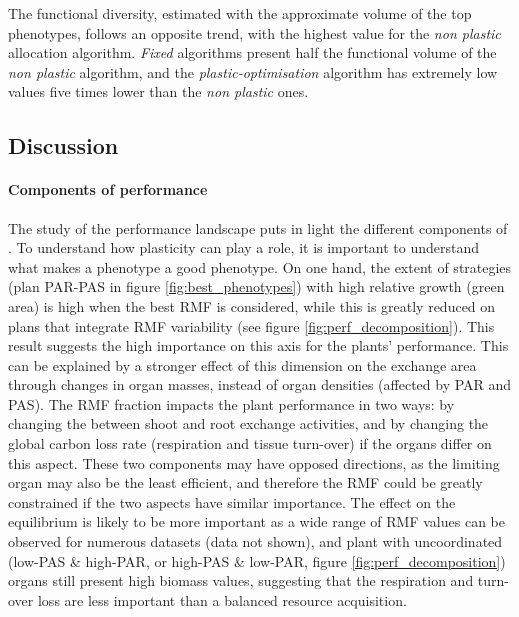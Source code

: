 The functional diversity, estimated with the approximate volume of the top phenotypes, follows an opposite trend, with the highest value for the \textit{non plastic} allocation algorithm. \textit{Fixed} algorithms present half the functional volume of the \textit{non plastic} algorithm, and the \textit{plastic-optimisation} algorithm has extremely low values five times lower than the \textit{non plastic} ones.



\subsection{Discussion}

\paragraph{Components of performance}

The study of the performance landscape puts in light the different components of . To understand how plasticity can play a role, it is important to understand what makes a phenotype a good phenotype. 
On one hand, the extent of strategies (plan PAR-PAS in figure \ref{fig:best_phenotypes}) with high relative growth (green area) is high when the best  RMF is considered, while this is greatly reduced on plans that integrate RMF variability (see figure \ref{fig:perf_decomposition}). This result suggests the high importance on this axis for the plants' performance. This can be explained by a stronger effect of this dimension on the exchange area through changes in organ masses, instead of organ densities (affected by PAR and PAS). The RMF fraction impacts the plant performance in two ways: by changing the  between shoot and root exchange activities, and by changing the global carbon loss rate (respiration and tissue turn-over) if the organs differ on this aspect. These two components may have opposed directions, as the limiting organ may also be the least efficient, and therefore the RMF could be greatly constrained if the two aspects have similar importance. The effect on the equilibrium is likely to be more important as a wide range of RMF values can be observed for numerous datasets (data not shown), and plant with uncoordinated (low-PAS \& high-PAR, or high-PAS \& low-PAR, \see figure \ref{fig:perf_decomposition}) organs still present high biomass values, suggesting that the respiration and turn-over loss are less important than a balanced resource acquisition. 


